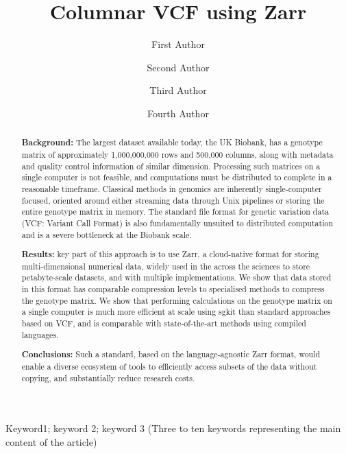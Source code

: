 \documentclass[a4paper,num-refs]{oup-contemporary}
\title{Columnar VCF using Zarr}
\author[1,\authfn{1},\authfn{2}]{First Author}
\author[2,\authfn{1},\authfn{2}]{Second Author}
\author[2]{Third Author}
\author[2,\authfn{1}]{Fourth Author}
\affil[1]{First Institution}
\affil[2]{Second Institution}
\begin{document}
\begin{frontmatter}
\maketitle


\begin{abstract}
\textbf{Background:}
The largest dataset available today, the UK Biobank,
has a genotype matrix of approximately 1,000,000,000 rows and 500,000 columns,
along with metadata and quality control information of similar dimension.
Processing such matrices on a single computer is not feasible,
and computations must be distributed to complete in a reasonable timeframe.
Classical methods in genomics are inherently single-computer focused,
oriented around either streaming data through Unix pipelines or
storing the entire genotype matrix in memory.
The standard file format for genetic variation data (VCF: Variant Call Format)
is also fundamentally unsuited to distributed computation and is a severe
bottleneck at the Biobank scale.

\textbf{Results:}
key part of this approach is to use Zarr, a cloud-native
format for storing multi-dimensional numerical data, widely used in the
across the sciences to store petabyte-scale datasets, and with
multiple implementations.  We show that data stored in this format has
comparable compression levels to specialised methods to compress the
genotype matrix. We show that performing calculations on the genotype
matrix on a single computer is much more efficient at scale using sgkit than standard
approaches based on VCF, and is comparable with state-of-the-art methods
using compiled languages.

\textbf{Conclusions:}
Such a standard, based on the language-agnostic Zarr format, would enable a
diverse ecosystem of tools to efficiently access subsets of the data without
copying, and substantially reduce research costs.
\end{abstract}

\begin{keywords}
Keyword1; keyword 2; keyword 3 (Three to ten keywords representing the main content of the article)
\end{keywords}
\end{frontmatter}
\end{document}
